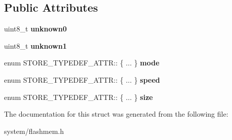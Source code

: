 \subsection*{Public Attributes}
\begin{DoxyCompactItemize}
\item 
\hypertarget{struct_s_t_o_r_e___t_y_p_e_d_e_f___a_t_t_r_a4baee634765e402525cdd5a7533aa610}{}uint8\+\_\+t {\bfseries unknown0}\label{struct_s_t_o_r_e___t_y_p_e_d_e_f___a_t_t_r_a4baee634765e402525cdd5a7533aa610}

\item 
\hypertarget{struct_s_t_o_r_e___t_y_p_e_d_e_f___a_t_t_r_a43c9f263daf7fc85ce959a9f03797c00}{}uint8\+\_\+t {\bfseries unknown1}\label{struct_s_t_o_r_e___t_y_p_e_d_e_f___a_t_t_r_a43c9f263daf7fc85ce959a9f03797c00}

\item 
\hypertarget{struct_s_t_o_r_e___t_y_p_e_d_e_f___a_t_t_r_ac0765c6b523f6570a36c519d4712898d}{}enum S\+T\+O\+R\+E\+\_\+\+T\+Y\+P\+E\+D\+E\+F\+\_\+\+A\+T\+T\+R\+:: \{ ... \}  {\bfseries mode}\label{struct_s_t_o_r_e___t_y_p_e_d_e_f___a_t_t_r_ac0765c6b523f6570a36c519d4712898d}

\item 
\hypertarget{struct_s_t_o_r_e___t_y_p_e_d_e_f___a_t_t_r_a21d923b01e2201ea767e2b9912557b31}{}enum S\+T\+O\+R\+E\+\_\+\+T\+Y\+P\+E\+D\+E\+F\+\_\+\+A\+T\+T\+R\+:: \{ ... \}  {\bfseries speed}\label{struct_s_t_o_r_e___t_y_p_e_d_e_f___a_t_t_r_a21d923b01e2201ea767e2b9912557b31}

\item 
\hypertarget{struct_s_t_o_r_e___t_y_p_e_d_e_f___a_t_t_r_a669b37aa21615e1ccd16145569b095e1}{}enum S\+T\+O\+R\+E\+\_\+\+T\+Y\+P\+E\+D\+E\+F\+\_\+\+A\+T\+T\+R\+:: \{ ... \}  {\bfseries size}\label{struct_s_t_o_r_e___t_y_p_e_d_e_f___a_t_t_r_a669b37aa21615e1ccd16145569b095e1}

\end{DoxyCompactItemize}


The documentation for this struct was generated from the following file\+:\begin{DoxyCompactItemize}
\item 
system/flashmem.\+h\end{DoxyCompactItemize}
